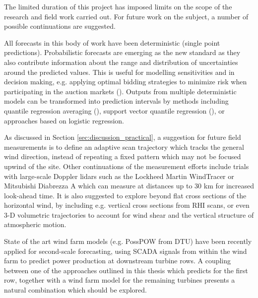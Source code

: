 The limited duration of this project has imposed limits on the scope of the research and field work carried out. For future work on the subject, a number of possible continuations are suggested.

All forecasts in this body of work have been deterministic (single point predictions). Probabilistic forecasts are emerging as the new standard as they also contribute information about the range and distribution of uncertainties around the predicted values. This is useful for modelling sensitivities and in decision making, e.g. applying optimal bidding strategies to minimize risk when participating in the auction markets (\cite{pinson_trading_2007}). Outputs from multiple deterministic models can be transformed into prediction intervals by methods including quantile regression averaging (\cite{nowotarski_computing_2015}), support vector quantile regression (\cite{he_short-term_2017}), or approaches based on logistic regression.

As discussed in Section \ref{sec:discussion_practical}, a suggestion for future field measurements is to define an adaptive scan trajectory which tracks the general wind direction, instead of repeating a fixed pattern which may not be focused upwind of the site. Other continuations of the measurement efforts include trials with large-scale Doppler lidars such as the Lockheed Martin WindTracer or Mitsubishi Diabrezza A which can measure at distances up to 30 km for increased look-ahead time. It is also suggested to explore beyond flat cross sections of the horizontal wind, by including e.g. vertical cross sections from RHI scans, or even 3-D volumetric trajectories to account for wind shear and the vertical structure of atmospheric motion.

State of the art wind farm models (e.g. PossPOW from DTU) have been recently applied for second-scale forecasting, using SCADA signals from within the wind farm to predict power production at downstream turbine rows. A coupling between one of the approaches outlined in this thesis which predicts for the first row, together with a wind farm model for the remaining turbines presents a natural combination which should be explored.


\begin{comment}
hybrid nwp model
Combine data set with wind farm SCADA for control possibilities
tune ANN model
couple with power curve like in waffle
\end{comment}